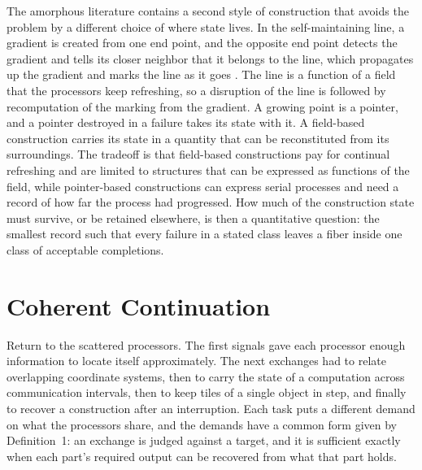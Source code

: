 \documentclass[11pt]{article}
\theoremstyle{definition}
\theoremstyle{plain}
\theoremstyle{remark}
\begin{document}
The amorphous literature contains a second style of construction that avoids the problem by a different choice of where state lives. In the self-maintaining line, a gradient is created from one end point, and the opposite end point detects the gradient and tells its closer neighbor that it belongs to the line, which propagates up the gradient and marks the line as it goes \cite{clement2003}. The line is a function of a field that the processors keep refreshing, so a disruption of the line is followed by recomputation of the marking from the gradient. A growing point is a pointer, and a pointer destroyed in a failure takes its state with it. A field-based construction carries its state in a quantity that can be reconstituted from its surroundings. The tradeoff is that field-based constructions pay for continual refreshing and are limited to structures that can be expressed as functions of the field, while pointer-based constructions can express serial processes and need a record of how far the process had progressed. How much of the construction state must survive, or be retained elsewhere, is then a quantitative question: the smallest record such that every failure in a stated class leaves a fiber inside one class of acceptable completions.

\section{Coherent Continuation}\label{sec:continuation}

Return to the scattered processors. The first signals gave each processor enough information to locate itself approximately. The next exchanges had to relate overlapping coordinate systems, then to carry the state of a computation across communication intervals, then to keep tiles of a single object in step, and finally to recover a construction after an interruption. Each task puts a different demand on what the processors share, and the demands have a common form given by Definition~1: an exchange is judged against a target, and it is sufficient exactly when each part's required output can be recovered from what that part holds.
\end{document}
